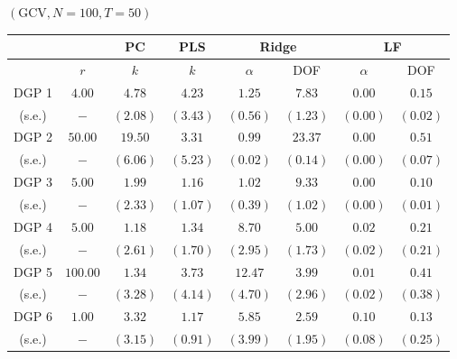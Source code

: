 
    \begin{center} $(\mathrm{GCV}, N=100, T=50)$ \
        \begin{tabular}{cccccccc}
            \hline \hline 
            & & PC & PLS & \multicolumn{2}{c}{Ridge} & \multicolumn{2}{c}{LF} \\
            \hline 
            & $r$ & $k$ & $k$ & $\alpha$ & DOF & $\alpha$ & DOF \\
            \hline 
            DGP 1 & $4.00$ & $4.78$ & $4.23$ & $1.25$ & $7.83$ & $0.00$ & $0.15$ \\
            (s.e.) & $-$ & $(2.08)$ & $(3.43)$ & $(0.56)$ & $(1.23)$ & $(0.00)$ & $(0.02)$ \\
            DGP 2 & $50.00$ & $19.50$ & $3.31$ & $0.99$ & $23.37$ & $0.00$ & $0.51$ \\
            (s.e.) & $-$ & $(6.06)$ & $(5.23)$ & $(0.02)$ & $(0.14)$ & $(0.00)$ & $(0.07)$ \\
            DGP 3 & $5.00$ & $1.99$ & $1.16$ & $1.02$ & $9.33$ & $0.00$ & $0.10$ \\
            (s.e.) & $-$ & $(2.33)$ & $(1.07)$ & $(0.39)$ & $(1.02)$ & $(0.00)$ & $(0.01)$ \\
            DGP 4 & $5.00$ & $1.18$ & $1.34$ & $8.70$ & $5.00$ & $0.02$ & $0.21$ \\
            (s.e.) & $-$ & $(2.61)$ & $(1.70)$ & $(2.95)$ & $(1.73)$ & $(0.02)$ & $(0.21)$ \\
            DGP 5 & $100.00$ & $1.34$ & $3.73$ & $12.47$ & $3.99$ & $0.01$ & $0.41$ \\
            (s.e.) & $-$ & $(3.28)$ & $(4.14)$ & $(4.70)$ & $(2.96)$ & $(0.02)$ & $(0.38)$ \\
            DGP 6 & $1.00$ & $3.32$ & $1.17$ & $5.85$ & $2.59$ & $0.10$ & $0.13$ \\
            (s.e.) & $-$ & $(3.15)$ & $(0.91)$ & $(3.99)$ & $(1.95)$ & $(0.08)$ & $(0.25)$ \\
            \hline
        \end{tabular}
    \end{center}
    